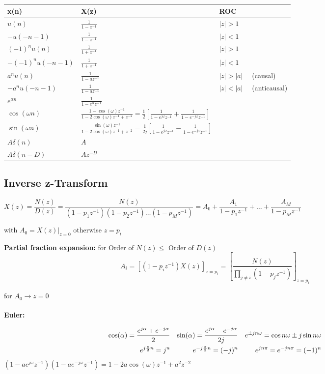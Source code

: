 \begin{tabular}{|l|l|l|}
	\hline
	\textbf{x(n)} & \textbf{X(z)} & \textbf{ROC} \\
	\hline
	$u(n)$ & $\frac{1}{1 - z^{-1}}$ & $|z|>1$ \\
	\hline
	$-u(-n-1)$ & $\frac{1}{1 - z^{-1}}$ & $|z|<1$ \\
	\hline
	$(-1)^n u(n)$ & $\frac{1}{1 + z^{-1}}$ & $|z|>1$ \\
	\hline
	$-(-1)^n u(-n-1)$ & $\frac{1}{1 + z^{-1}}$ & $|z|<1$ \\
	\hline
	$a^n u(n)$ & $\frac{1}{1 - az^{-1}}$ & $|z|>|a| \quad$ (causal) \\
	\hline
	$-a^n u(-n-1)$ & $\frac{1}{1 - az^{-1}}$ & $|z|<|a| \quad$ (anticausal) \\
	\hline
	$e^{\alpha n}$ & $\frac{1}{1-e^{\alpha}z^{-1}}$ & \\
	\hline
	$\cos(\omega n)$ & $\frac{1-\cos(\omega)z^{-1}}{1-2\cos(\omega)z^{-1}+z^{-2}}
	 = \frac{1}{2}\left[\frac{1}{1-e^{j\omega}z^{-1}}+ \frac{1}{1-e^{-j\omega}z^{-1}}\right]$ & \\
	\hline
	$\sin(\omega n)$ & $\frac{\sin(\omega)z^{-1}}{1-2\cos(\omega)z^{-1}+z^{-2}}
  = \frac{1}{2j}\left[\frac{1}{1-e^{j\omega}z^{-1}}- \frac{1}{1-e^{-j\omega}z^{-1}}\right]$ & \\
	\hline
	$A\delta(n)$ & $A$ & \\
	\hline
	$A\delta(n-D)$ & $Az^{-D}$ & \\
	\hline
\end{tabular}


\subsection{Inverse z-Transform}

$X(z) = \dfrac{N(z)}{D(z)} = \dfrac{N(z)}{(1-p_1z^{-1})(1-p_2z^{-1})\ldots(1-p_Mz^{-1})} = 
A_0 + \dfrac{A_1}{1-p_1z^{-1}} + \ldots + \dfrac{A_M}{1-p_Mz^{-1}}$

with $A_0 = X(z)|_{z=0}$ otherwise $z = p_i$

\textbf{Partial fraction expansion:} for Order of $N(z) \leq$ Order of $D(z)$ \\
\[A_i = [(1-p_iz^{-1})X(z)]_{z=p_i} = \left[\frac{N(z)}{\prod\limits_{j\neq i}(1-p_jz^{-1})}\right]_{z=p_i}\]

for $A_0 \rightarrow z=0$\\ \\

\textbf{Euler:}

\begin{align}
\cos(\alpha) = \frac{e^{j\alpha} + e^{-j\alpha}}{2}
&& \sin(\alpha) = \frac{e^{j\alpha} - e^{-j\alpha}}{2j} && 
    {e}^{\pm jn\omega} = \cos{n\omega} \pm j \sin{n\omega} \notag\\
e^{j\frac{\pi}{2}n} = j^n & & e^{-j\frac{\pi}{2}n} = (-j)^n &&
e^{jn\pi}=e^{-jn\pi}=(-1)^n \notag
\end{align}
$(1-ae^{j\omega}z^{-1})(1-ae^{-j\omega}z^{-1}) = 1 - 2a\cos(\omega)z^{-1}+a^2z^{-2}$



